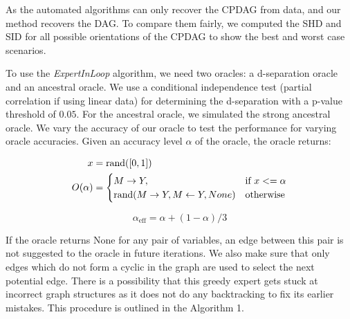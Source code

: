 \documentclass{uai2025} %
\begin{document}

As the automated algorithms can only recover the CPDAG from data, and our
method recovers the DAG. To compare them fairly, we computed the SHD and SID
for all possible orientations of the CPDAG to show the best and worst case scenarios.

To use the \textit{ExpertInLoop} algorithm, we need two oracles: a d-separation
oracle and an ancestral oracle. We use a conditional independence test (partial
correlation if using linear data) for determining the d-separation with a
p-value threshold of $ 0.05 $. For the ancestral oracle, we simulated the
strong ancestral oracle. We vary the accuracy of our oracle to test the
performance for varying oracle accuracies. Given an accuracy level $ \alpha $
of the oracle, the oracle returns:

\begin{equation}
	\begin{split}
		x &= \textnormal{rand}([0, 1]) \\
		O(\alpha) &= \begin{cases} 
			M \rightarrow Y, & \textnormal{if  } x <= \alpha \\
			\textnormal{rand}(M \rightarrow Y, M \leftarrow Y, None) & \textnormal{otherwise} \\
				\end{cases} \\
	\end{split}
\end{equation}

\begin{equation}
	\alpha_{\mathrm{eff}} = \alpha + (1 - \alpha) / 3
\end{equation}

If the oracle returns None for any pair of variables, an edge between this pair
is not suggested to the oracle in future iterations. We also make sure that
only edges which do not form a cyclic in the graph are used to select the next
potential edge. There is a possibility that this greedy expert gets stuck at
incorrect graph structures as it does not do any backtracking to fix its
earlier mistakes. This procedure is outlined in the Algorithm 1.
\end{document}
